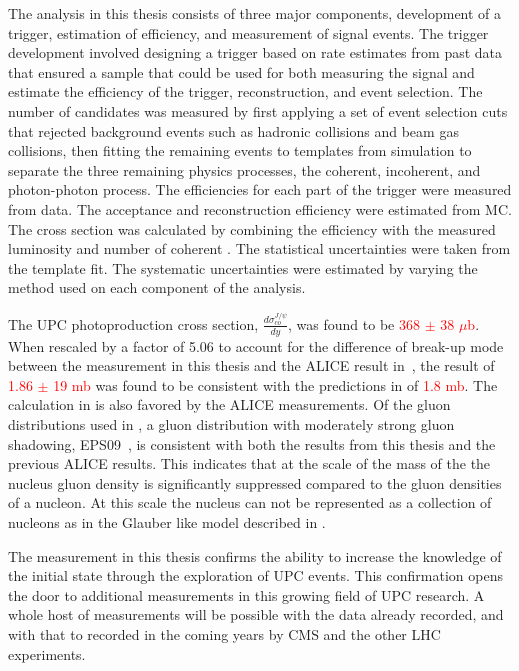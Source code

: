     The analysis in this thesis consists of three major components, development
      of a trigger, estimation of efficiency, and measurement of signal events.
    The trigger development involved designing a trigger based on rate estimates
      from past data that ensured a sample that could be used for both measuring
      the signal and estimate the efficiency of the trigger, reconstruction, and
      event selection.
    The number of \JPsi{} candidates was measured by first applying a set 
      of event selection cuts that rejected background events such as hadronic
      collisions and beam gas collisions, then fitting the remaining events to
      templates from simulation to separate the three remaining physics processes,
      the coherent, incoherent, and photon-photon process.
    The efficiencies for each part of the trigger were measured from data. 
    The acceptance and reconstruction efficiency were estimated from MC.
    The cross section was calculated by combining the efficiency with the 
      measured luminosity and number of coherent \JPsi{}.
    The statistical uncertainties were taken from the template fit.
    The systematic uncertainties were estimated by varying the method used on 
      each component of the analysis. 
  
    The UPC \JPsi{} photoproduction cross section, $\frac{d\sigma^{J/\psi}_{co}}{dy}$,
      was found to be \textcolor{red}{368 $\pm$ 38 $\mu$b}. 
    When rescaled by a factor of 5.06 to account for the difference of break-up mode between 
      the measurement in this thesis and the ALICE result in~\cite{Abelev:2012ba,Abbas:2013oua}, the 
      result of \textcolor{red}{1.86 $\pm$ 19 mb} was found to be consistent with the 
      predictions in \cite{pQCD2013.02} of \textcolor{red}{1.8 mb}.  
    The calculation in \cite{pQCD2013.02} is also favored by the ALICE measurements. 
    Of the gluon distributions used in \cite{pQCD2013.02}, a gluon distribution with 
      moderately strong gluon shadowing, EPS09~\cite{Eskola:2009uj}, is consistent with both the results from this
      thesis and the previous ALICE results. 
    This indicates that at the scale of the mass of the \JPsi{} the nucleus gluon density is 
      significantly suppressed compared to the gluon densities of a nucleon.
    At this scale the nucleus can not be represented as a collection of nucleons as in the 
      Glauber like model described in \cite{vmd1999}.
  
    The measurement in this thesis confirms the ability to increase the knowledge of the 
      initial state through the exploration of UPC events. 
    This confirmation opens the door to additional measurements in this growing field of UPC
      research.
    A whole host of measurements will be possible with the data already recorded,
      and with that to recorded in the coming years by CMS and the other LHC 
      experiments. 